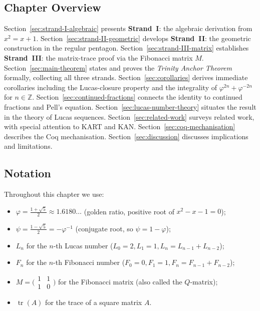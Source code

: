 \subsection{Chapter Overview}

Section~\ref{sec:strand-I-algebraic} presents \textbf{Strand~I}:
the algebraic derivation from $x^{2}=x+1$.
Section~\ref{sec:strand-II-geometric} develops \textbf{Strand~II}:
the geometric construction in the regular pentagon.
Section~\ref{sec:strand-III-matrix} establishes \textbf{Strand~III}:
the matrix-trace proof via the Fibonacci matrix $M$.
Section~\ref{sec:main-theorem} states and proves the
\emph{Trinity Anchor Theorem} formally, collecting all three
strands.
Section~\ref{sec:corollaries} derives immediate corollaries
including the Lucas-closure property and the integrality of
$\varphi^{2n}+\varphi^{-2n}$ for $n \in \mathbb{Z}$.
Section~\ref{sec:continued-fractions} connects the identity
to continued fractions and Pell's equation.
Section~\ref{sec:lucas-number-theory} situates the result in
the theory of Lucas sequences.
Section~\ref{sec:related-work} surveys related work, with
special attention to KART and KAN.
Section~\ref{sec:coq-mechanisation} describes the Coq
mechanisation.
Section~\ref{sec:discussion} discusses implications and
limitations.

\subsection{Notation}

Throughout this chapter we use:
\begin{itemize}
  \item $\varphi = \tfrac{1+\sqrt{5}}{2} \approx 1.6180\ldots$
        (golden ratio, positive root of $x^{2}-x-1=0$);
  \item $\psi = \tfrac{1-\sqrt{5}}{2} = -\varphi^{-1}$
        (conjugate root, so $\psi = 1 - \varphi$);
  \item $L_{n}$ for the $n$-th Lucas number
        ($L_{0}=2, L_{1}=1, L_{n}=L_{n-1}+L_{n-2}$);
  \item $F_{n}$ for the $n$-th Fibonacci number
        ($F_{0}=0, F_{1}=1, F_{n}=F_{n-1}+F_{n-2}$);
  \item $M = \bigl(\begin{smallmatrix}1&1\\1&0\end{smallmatrix}\bigr)$
        for the Fibonacci matrix (also called the $Q$-matrix);
  \item $\operatorname{tr}(A)$ for the trace of a square matrix $A$.
\end{itemize}

